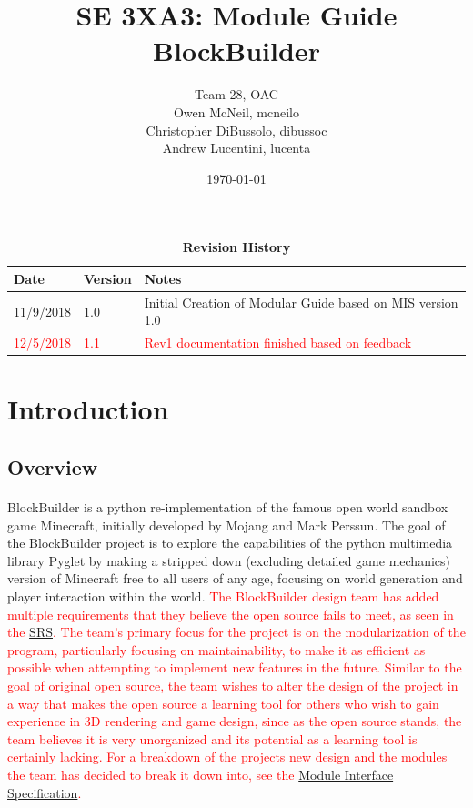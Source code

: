 \documentclass[12pt, titlepage]{article}
\title{SE 3XA3: Module Guide\\BlockBuilder}
\author{Team 28, OAC
		\\ Owen McNeil, mcneilo
		\\ Christopher DiBussolo, dibussoc
		\\ Andrew Lucentini, lucenta
}
\date{\today}
\begin{document}
\maketitle

\tableofcontents
\listoftables
\listoffigures

\begin{table}[btp]
\caption{\bf Revision History}
\begin{tabularx}{\textwidth}{p{3cm}p{2cm}X}
\toprule {\bf Date} & {\bf Version} & {\bf Notes}\\
\midrule
11/9/2018 & 1.0 & Initial Creation of Modular Guide based on MIS version 1.0\\
\textcolor{red}{12/5/2018} & \textcolor{red}{1.1} & \textcolor{red}{Rev1 documentation finished based on feedback}\\
\bottomrule
\end{tabularx}
\end{table}

\newpage

\newpage\phantom{blabla}
\newpage\phantom{blabla}

\section{Introduction}
\subsection{Overview}
\paragraph{}
BlockBuilder is a python re-implementation of the famous open world sandbox game Minecraft, initially developed by Mojang and Mark Perssun. The goal of the BlockBuilder project is to explore the capabilities of the python multimedia library Pyglet by making a stripped down (excluding detailed game mechanics) version of Minecraft free to all users of any age, focusing on world generation and player interaction within the world.
\textcolor{red}{The BlockBuilder design team has added multiple requirements that they believe the open source fails to meet, as seen in the \href{https://gitlab.cas.mcmaster.ca/lucenta/3XA3/blob/master/Doc/SRS/SRS.pdf}{SRS}. The team's primary focus for the project is on the modularization of the program, particularly focusing on maintainability, to make it as efficient as possible when attempting to implement new features in the future. Similar to the goal of original open source, the team wishes to alter the design of the project in a way that makes the open source a learning tool for others who wish to gain experience in 3D rendering and game design, since as the open source stands, the team believes it is very unorganized and its potential as a learning tool is certainly lacking. For a breakdown of the projects new design and the modules the team has decided to break it down into, see the \href{https://gitlab.cas.mcmaster.ca/lucenta/3XA3/blob/master/Doc/Design/MIS/MIS.pdf}{Module Interface Specification}.} 
\end{document}
